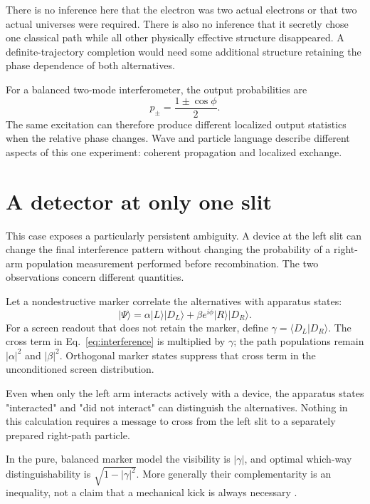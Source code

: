 \documentclass[11pt,a4paper]{article}
\newcommand{\ket}[1]{\lvert #1\rangle}
\begin{document}
There is no inference here that the electron was two actual electrons or that two actual universes were required. There is also no inference that it secretly chose one classical path while all other physically effective structure disappeared. A definite-trajectory completion would need some additional structure retaining the phase dependence of both alternatives.

For a balanced two-mode interferometer, the output probabilities are
\begin{equation}
p_\pm=\frac{1\pm\cos\phi}{2}.
\end{equation}
The same excitation can therefore produce different localized output statistics when the relative phase changes. Wave and particle language describe different aspects of this one experiment: coherent propagation and localized exchange.

\section{A detector at only one slit}
\label{sec:onearm}
This case exposes a particularly persistent ambiguity. A device at the left slit can change the final interference pattern without changing the probability of a right-arm population measurement performed before recombination. The two observations concern different quantities.

Let a nondestructive marker correlate the alternatives with apparatus states:
\begin{equation}
\ket{\Psi}=\alpha\ket{L}\ket{D_L}
            +\beta e^{i\phi}\ket{R}\ket{D_R}.
\end{equation}
For a screen readout that does not retain the marker, define
\(\gamma=\langle D_L|D_R\rangle\). The cross term in
Eq.~\eqref{eq:interference} is multiplied by \(\gamma\); the path populations remain \(|\alpha|^2\) and \(|\beta|^2\). Orthogonal marker states suppress that cross term in the unconditioned screen distribution.

Even when only the left arm interacts actively with a device, the apparatus states "interacted" and "did not interact" can distinguish the alternatives. Nothing in this calculation requires a message to cross from the left slit to a separately prepared right-path particle.

In the pure, balanced marker model the visibility is \(|\gamma|\), and optimal which-way distinguishability is \(\sqrt{1-|\gamma|^2}\). More generally their complementarity is an inequality, not a claim that a mechanical kick is always necessary \cite{Englert}.
\end{document}
